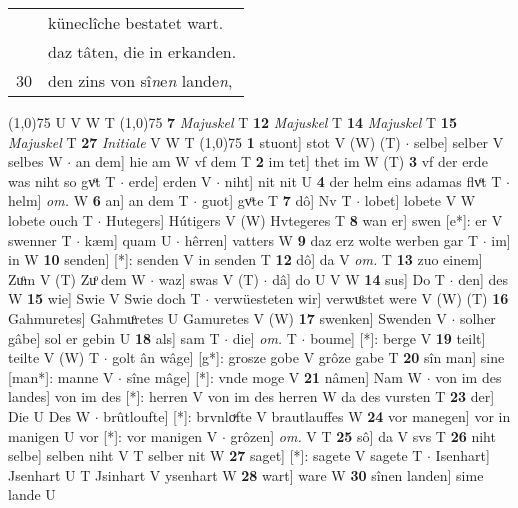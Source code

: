 \documentclass[8pt,a4paper,notitlepage]{article}
\begin{document}
\begin{table}[ht]
\begin{minipage}[t]{0.5\linewidth}
\begin{tabular}{rl}
 & küneclîche bestatet wart.\\ 
 & daz tâten, die in erkanden.\\ 
30 & den zins von sî\textit{n}e\textit{n} lande\textit{n},\\ 
\end{tabular}
\scriptsize
\line(1,0){75} \newline
U V W T \newline
\line(1,0){75} \newline
\textbf{7} \textit{Majuskel} T  \textbf{12} \textit{Majuskel} T  \textbf{14} \textit{Majuskel} T  \textbf{15} \textit{Majuskel} T  \textbf{27} \textit{Initiale} V W T  \newline
\line(1,0){75} \newline
\textbf{1} stuont] stot V (W) (T)  $\cdot$ selbe] selber V selbes W  $\cdot$ an dem] hie am W vf dem T \textbf{2} im tet] thet im W (T) \textbf{3} vf der erde was niht so gvͦt T  $\cdot$ erde] erden V  $\cdot$ niht] nit nit U \textbf{4} der helm eins adamas flvͦt T  $\cdot$ helm] \textit{om.} W \textbf{6} an] an dem T  $\cdot$ guot] gvͦte T \textbf{7} dô] Nv T  $\cdot$ lobet] lobete V W lobete ouch T  $\cdot$ Hutegers] Hútigers V (W) Hvtegeres T \textbf{8} wan er] swen [e*]: er V swenner T  $\cdot$ kæm] quam U  $\cdot$ hêrren] vatters W \textbf{9} daz erz wolte werben gar T  $\cdot$ im] in W \textbf{10} senden] [*]: senden V in senden T \textbf{12} dô] da V \textit{om.} T \textbf{13} zuo einem] Zuͦm V (T) Zuͦ dem W  $\cdot$ waz] swas V (T)  $\cdot$ dâ] do U V W \textbf{14} sus] Do T  $\cdot$ den] des W \textbf{15} wie] Swie V Swie doch T  $\cdot$ verwüesteten wir] verwuͦstet were V (W) (T) \textbf{16} Gahmuretes] Gahmuͦretes U Gamuretes V (W) \textbf{17} swenken] Swenden V  $\cdot$ solher gâbe] sol er gebin U \textbf{18} als] sam T  $\cdot$ die] \textit{om.} T  $\cdot$ boume] [*]: berge V \textbf{19} teilt] teilte V (W) T  $\cdot$ golt ân wâge] [g*]: grosze gobe V grôze gabe T \textbf{20} sîn man] sine [man*]: manne V  $\cdot$ sîne mâge] [*]: vnde moge V \textbf{21} nâmen] Nam W  $\cdot$ von im des landes] von im des [*]: herren V von im des herren W da des vursten T \textbf{23} der] Die U Des W  $\cdot$ brûtloufte] [*]: brvnloͮfte V brautlauffes W \textbf{24} vor manegen] vor in manigen U vor [*]: vor manigen V  $\cdot$ grôzen] \textit{om.} V T \textbf{25} sô] da V svs T \textbf{26} niht selbe] selben niht V T selber nit W \textbf{27} saget] [*]: sagete V sagete T  $\cdot$ Isenhart] Jsenhart U T Jsinhart V ysenhart W \textbf{28} wart] ware W \textbf{30} sînen landen] sime lande U \newline
\end{minipage}
\end{table}
\end{document}
